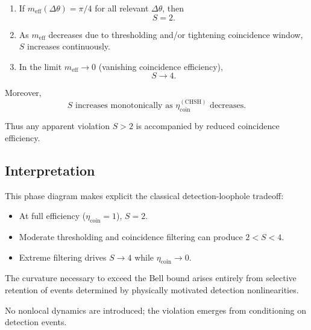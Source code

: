 \begin{enumerate}
    \item If $m_{\mathrm{eff}}(\Delta\theta)=\pi/4$ for all relevant $\Delta\theta$, then
    \[
    S = 2.
    \]
    \item As $m_{\mathrm{eff}}$ decreases due to thresholding and/or tightening coincidence window, $S$ increases continuously.
    \item In the limit $m_{\mathrm{eff}}\to 0$ (vanishing coincidence efficiency),
    \[
    S \to 4.
    \]
\end{enumerate}

Moreover,
\begin{equation}
\boxed{
S \text{ increases monotonically as }
\eta_{\mathrm{coin}}^{\mathrm{(CHSH)}} \text{ decreases}.
}
\end{equation}

Thus any apparent violation $S>2$ is accompanied by reduced coincidence efficiency.

\subsection{Interpretation}

This phase diagram makes explicit the classical detection-loophole tradeoff:

\begin{itemize}
    \item At full efficiency ($\eta_{\mathrm{coin}}=1$), $S=2$.
    \item Moderate thresholding and coincidence filtering can produce $2 < S < 4$.
    \item Extreme filtering drives $S\to 4$ while $\eta_{\mathrm{coin}}\to 0$.
\end{itemize}

The curvature necessary to exceed the Bell bound arises entirely from selective retention of events determined by physically motivated detection nonlinearities.

No nonlocal dynamics are introduced; the violation emerges from conditioning on detection events.
